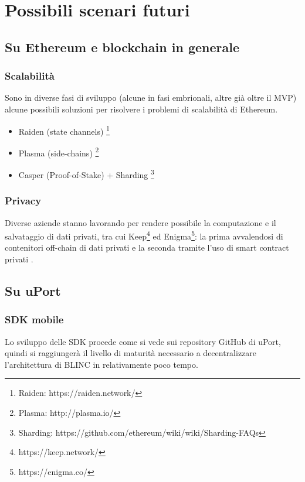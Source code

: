 \section{Possibili scenari futuri}

\subsection{Su Ethereum e blockchain in generale}

\subsubsection{Scalabilità}

Sono in diverse fasi di sviluppo (alcune in fasi embrionali, altre già oltre il MVP)
alcune possibili soluzioni per risolvere i problemi di scalabilità di Ethereum.

\begin{itemize}
  \item Raiden (state channels) \footnote{Raiden: https://raiden.network/}
  \item Plasma (side-chains) \footnote{Plasma: http://plasma.io/}
  \item Casper (Proof-of-Stake) + Sharding \footnote{Sharding: https://github.com/ethereum/wiki/wiki/Sharding-FAQs}
\end{itemize}

\subsubsection{Privacy}

Diverse aziende stanno lavorando per rendere possibile la computazione
e il salvataggio di dati privati, tra cui Keep\footnote{https://keep.network/} \cite{ARTICLE:1} ed Enigma\footnote{https://enigma.co/}:
la prima avvalendosi di contenitori off-chain di dati privati e la seconda tramite
l’uso di smart contract privati \cite{ARTICLE:2}.

\subsection{Su uPort}

\subsubsection{SDK mobile}

Lo sviluppo delle SDK procede come si vede sui repository GitHub di uPort,
quindi si raggiungerà il livello di maturità necessario a decentralizzare
l’architettura di BLINC in relativamente poco tempo.

